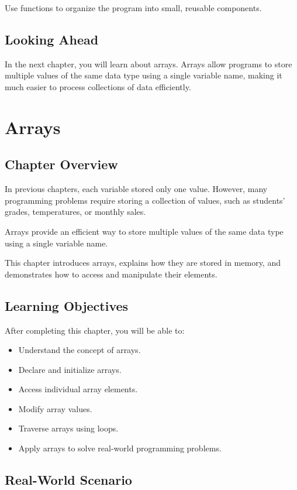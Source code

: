 \documentclass[12pt,openany]{book}
\begin{document}
Use functions to organize the program into small, reusable components.

\section{Looking Ahead}

In the next chapter, you will learn about arrays. Arrays allow programs to store multiple values of the same data type using a single variable name, making it much easier to process collections of data efficiently.
\chapter{Arrays}

\section{Chapter Overview}

In previous chapters, each variable stored only one value. However, many programming problems require storing a collection of values, such as students' grades, temperatures, or monthly sales.

Arrays provide an efficient way to store multiple values of the same data type using a single variable name.

This chapter introduces arrays, explains how they are stored in memory, and demonstrates how to access and manipulate their elements.

\section{Learning Objectives}

After completing this chapter, you will be able to:

\begin{itemize}
    \item Understand the concept of arrays.
    \item Declare and initialize arrays.
    \item Access individual array elements.
    \item Modify array values.
    \item Traverse arrays using loops.
    \item Apply arrays to solve real-world programming problems.
\end{itemize}

\section{Real-World Scenario}
\end{document}
